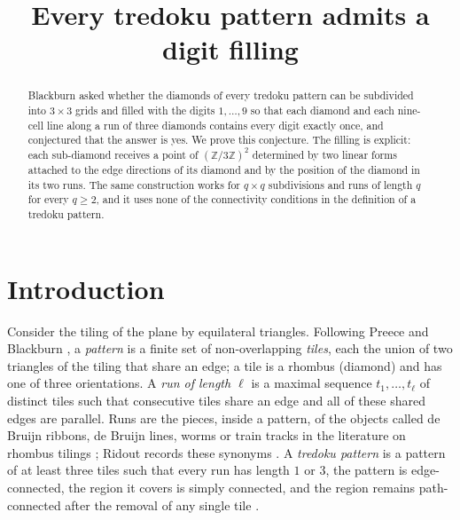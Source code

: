 \documentclass[11pt,a4paper]{amsart}
\title{Every tredoku pattern admits a digit filling}
\theoremstyle{definition}
\theoremstyle{remark}
\newcommand{\Z}{\mathbb{Z}}
\begin{document}
\begin{abstract}
Blackburn asked whether the diamonds of every tredoku pattern can be subdivided into $3\times 3$ grids and filled with the digits $1,\dots,9$ so that each diamond and each nine-cell line along a run of three diamonds contains every digit exactly once, and conjectured that the answer is yes.
We prove this conjecture.
The filling is explicit: each sub-diamond receives a point of $(\Z/3\Z)^2$ determined by two linear forms attached to the edge directions of its diamond and by the position of the diamond in its two runs.
The same construction works for $q\times q$ subdivisions and runs of length $q$ for every $q\ge 2$, and it uses none of the connectivity conditions in the definition of a tredoku pattern.
\end{abstract}

\maketitle

\section{Introduction}

Consider the tiling of the plane by equilateral triangles. Following Preece and Blackburn \cite{Blackburn}, a \emph{pattern} is a finite set of non-overlapping \emph{tiles}, each the union of two triangles of the tiling that share an edge; a tile is a rhombus (diamond) and has one of three orientations. A \emph{run of length $\ell$} is a maximal sequence $t_1,\dots,t_\ell$ of distinct tiles such that consecutive tiles share an edge and all of these shared edges are parallel. Runs are the pieces, inside a pattern, of the objects called de Bruijn ribbons, de Bruijn lines, worms or train tracks in the literature on rhombus tilings \cite{dB,BFRR,FH,KS}; Ridout records these synonyms \cite{Ridout}. A \emph{tredoku pattern} is a pattern of at least three tiles such that every run has length $1$ or $3$, the pattern is edge-connected, the region it covers is simply connected, and the region remains path-connected after the removal of any single tile \cite[Section~1]{Blackburn}.
\end{document}
